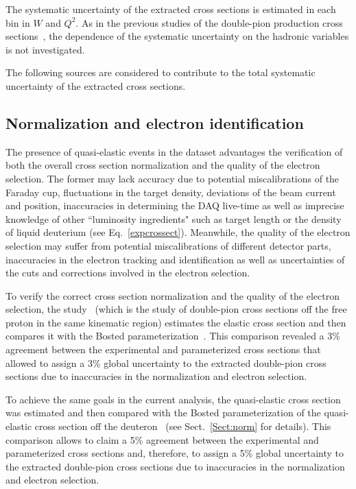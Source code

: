 The systematic uncertainty of the extracted cross sections is estimated in each bin in $W$ and $Q^{2}$. As in the previous studies of the double-pion production cross sections~\cite{Rip_an_note:2002,Ripani:2002ss,Fed_an_note:2007,Fedotov:2008aa,Isupov:2017lnd,Arjun,Fed_an_note:2017,Fed_paper_2018}, the dependence of the systematic uncertainty on the hadronic variables is not investigated. 


The following sources are considered to contribute to the total systematic uncertainty of the extracted cross sections.


\subsection{Normalization and electron identification}

The presence of quasi-elastic events in the dataset advantages the verification of both the overall cross section normalization and the quality of the electron selection. The former may lack accuracy due to potential miscalibrations of the Faraday cup, fluctuations in the target density, deviations of the beam current and position, inaccuracies in determining the DAQ live-time as well as imprecise knowledge of other ``luminosity ingredients" such as target length or the density of liquid deuterium (see Eq.~\eqref{expcrossect}). Meanwhile, the quality of the electron selection may suffer from potential miscalibrations of different detector parts, inaccuracies in the electron tracking and identification as well as uncertainties of the cuts and corrections involved in the electron selection.

To verify the correct cross section normalization and the quality of the electron selection, the study~\cite{Fed_an_note:2017,Fed_paper_2018} (which is the study of double-pion cross sections off the free proton in the same kinematic region) estimates the elastic cross section and then compares it with the Bosted parameterization~\cite{Bosted:1994tm}. This comparison revealed a 3\% agreement between the experimental and parameterized cross sections that allowed to assign a 3\% global uncertainty to the extracted double-pion cross sections due to inaccuracies in the normalization and electron selection.

To achieve the same goals in the current analysis, the quasi-elastic cross section was estimated and then compared with the Bosted  parameterization of the quasi-elastic cross section off the deuteron~\cite{Bosted_fit,Bosted:2007xd} (see Sect.~\ref{Sect:norm} for details). This comparison allows to claim a 5\% agreement between the experimental and parameterized cross sections and, therefore, to assign a 5\% global uncertainty to the extracted double-pion cross sections due to inaccuracies in the normalization and electron selection.



